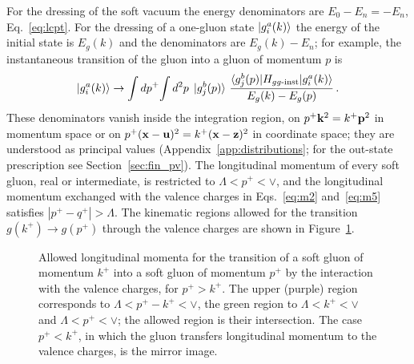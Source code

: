 For the dressing of the soft vacuum the energy denominators are $E_0-E_n=-E_n$, Eq.~\eqref{eq:lcpt}. For the dressing of a one-gluon state $\ket{g^a_i(k)}$ the energy of the initial state is $E_g(k)$ and the denominators are $E_g(k)-E_n$; for example, the instantaneous transition of the gluon into a gluon of momentum $p$ is
\begin{align}
\ket{g^a_i(k)}\to\int dp^+\!\int d^2p\;\ket{g^b_j(p)}\,\frac{\braket{g^b_j(p)|H_{gg\text{-inst}}|g^a_i(k)}}{E_g(k)-E_g(p)}\,.
\end{align}
These denominators vanish inside the integration region, on $p^+\mathbf{k}^2=k^+\mathbf{p}^2$ in momentum space or on $p^+(\mathbf{x}-\mathbf{u})^2=k^+(\mathbf{x}-\mathbf{z})^2$ in coordinate space; they are understood as principal values (Appendix~\ref{app:distributions}; for the out-state prescription see Section~\ref{sec:fin_pv}). The longitudinal momentum of every soft gluon, real or intermediate, is restricted to $\Lambda<p^+<\vee$, and the longitudinal momentum exchanged with the valence charges in Eqs.~\eqref{eq:m2} and~\eqref{eq:m5} satisfies $|p^+-q^+|>\Lambda$. The kinematic regions allowed for the transition $g(k^+)\to g(p^+)$ through the valence charges are shown in Figure~\ref{fig:kinem}.

\begin{figure}[t]
\centering
{}
\caption{Allowed longitudinal momenta for the transition of a soft gluon of momentum $k^+$ into a soft gluon of momentum $p^+$ by the interaction with the valence charges, for $p^+>k^+$. The upper (purple) region corresponds to $\Lambda<p^+-k^+<\vee$, the green region to $\Lambda<k^+<\vee$ and $\Lambda<p^+<\vee$; the allowed region is their intersection. The case $p^+<k^+$, in which the gluon transfers longitudinal momentum to the valence charges, is the mirror image.}
\label{fig:kinem}
\end{figure}
